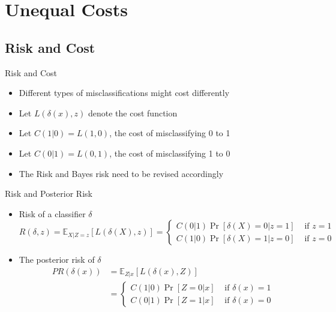 \documentclass[
  ignorenonframetext,
]{beamer}
\providecommand{\tightlist}{%
  \setlength{\itemsep}{0pt}\setlength{\parskip}{0pt}}
\begin{document}
\hypertarget{unequal-costs}{%
\section{Unequal Costs}\label{unequal-costs}}

\hypertarget{risk-and-cost}{%
\subsection{Risk and Cost}\label{risk-and-cost}}

\begin{frame}{Risk and Cost}
\begin{itemize}
\tightlist
\item
  Different types of misclassifications might cost differently
\item
  Let \(L(\delta(x), z)\) denote the cost function
\item
  Let \(C(1|0)=L(1, 0)\), the cost of misclassifying 0 to 1
\item
  Let \(C(0|1)=L(0, 1)\), the cost of misclassifying 1 to 0
\item
  The Risk and Bayes risk need to be revised accordingly
\end{itemize}
\end{frame}

\begin{frame}{Risk and Posterior Risk}
\protect\hypertarget{risk-and-posterior-risk-1}{}
\begin{itemize}
\item
  Risk of a classifier \(\delta\)
  \[R(\delta, z)=\mathbb E_{X|Z=z} [L(\delta(X), z)]=\left\{
  \begin{array}{cc}
  C(0|1)\Pr[\delta(X)=0|z=1] & \mbox{ if } z=1\\
  C(1|0)\Pr[\delta(X)=1|z=0] & \mbox{ if } z=0
  \end{array}\right.\]
\item
  The posterior risk of \(\delta\) \[\begin{aligned}
  PR(\delta(x)) &= \mathbb E_{Z|x}[L(\delta(x), Z)]\\
  &=\left\{
  \begin{array}{cc}
  C(1|0)\Pr[Z=0|x] & \mbox{ if } \delta(x)=1\\
  C(0|1)\Pr[Z=1|x] & \mbox{ if } \delta(x)=0
  \end{array}\right.
  \end{aligned}\]
\end{itemize}
\end{frame}
\end{document}

